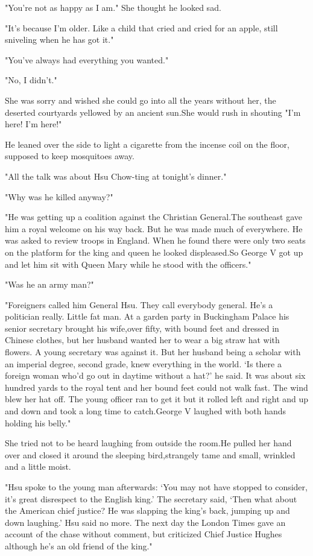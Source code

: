 \par "You're not as happy as I am." She thought he looked sad.
\par "It's because I'm older. Like a child that cried and cried for an apple, still sniveling when he has got it."
\par "You've always had everything you wanted."
\par "No, I didn't."
\par She was sorry and wished she could go into all the years without her, the deserted courtyards yellowed by an ancient sun.She would rush in shouting "I'm here! I'm here!"
\par He leaned over the side to light a cigarette from the incense coil on the floor, supposed to keep mosquitoes away.
\par "All the talk was about Hsu Chow-ting at tonight's dinner."
\par "Why was he killed anyway?"
\par "He was getting up a coalition against the Christian General.The southeast gave him a royal welcome on his way back. But he was made much of everywhere. He was asked to review troops in England. When he found there were only two seats on the platform for the king and queen he looked displeased.So George V got up and let him sit with Queen Mary while he stood with the officers."
\par "Was he an army man?"
\par "Foreigners called him General Hsu. They call everybody general. He's a politician really. Little fat man. At a garden party in Buckingham Palace his senior secretary brought his wife,over fifty, with bound feet and dressed in Chinese clothes, but her husband wanted her to wear a big straw hat with flowers. A young secretary was against it. But her husband being a scholar with an imperial degree, second grade, knew everything in the world. ‘Is there a foreign woman who'd go out in daytime without a hat?' he said. It was about six hundred yards to the royal tent and her bound feet could not walk fast. The wind blew her hat off. The young officer ran to get it but it rolled left and right and up and down and took a long time to catch.George V laughed with both hands holding his belly."
\par She tried not to be heard laughing from outside the room.He pulled her hand over and closed it around the sleeping  bird,strangely tame and small, wrinkled and a little moist.
\par "Hsu spoke to the young man afterwards: ‘You may not have stopped to consider, it's great disrespect to the English king.' The secretary said, ‘Then what about the American chief justice? He was slapping the king's back, jumping up and down laughing.' Hsu said no more. The next day the London Times gave an account of the chase without comment, but criticized Chief Justice Hughes although he's an old friend of the king."
